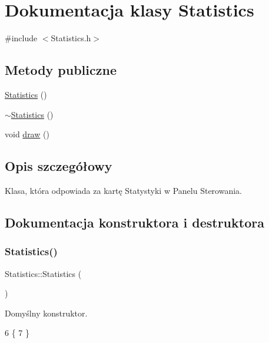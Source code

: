 \hypertarget{class_statistics}{}\section{Dokumentacja klasy Statistics}
\label{class_statistics}


{\ttfamily \#include $<$Statistics.\+h$>$}

\subsection*{Metody publiczne}
\begin{DoxyCompactItemize}
\item 
\mbox{\hyperlink{class_statistics_a60ddd90a571ed4c3ce8c0f6317a36d63}{Statistics}} ()
\item 
\mbox{\hyperlink{class_statistics_ab68ede75479e44d5c35b78ec1284065b}{$\sim$\+Statistics}} ()
\item 
void \mbox{\hyperlink{class_statistics_a5345e618eb4d5b8448a86d519d5ee33d}{draw}} ()
\end{DoxyCompactItemize}


\subsection{Opis szczegółowy}
Klasa, która odpowiada za kartę Statystyki w Panelu Sterowania. 

\subsection{Dokumentacja konstruktora i destruktora}
\mbox{\label{class_statistics_a60ddd90a571ed4c3ce8c0f6317a36d63}} 
\subsubsection{\texorpdfstring{Statistics()}{Statistics()}}
{\footnotesize\ttfamily Statistics\+::\+Statistics (\begin{DoxyParamCaption}{ }\end{DoxyParamCaption})}

Domyślny konstruktor. 
\begin{DoxyCode}
6 \{
7 \}
\end{DoxyCode}
\mbox{\label{class_statistics_ab68ede75479e44d5c35b78ec1284065b}} 
